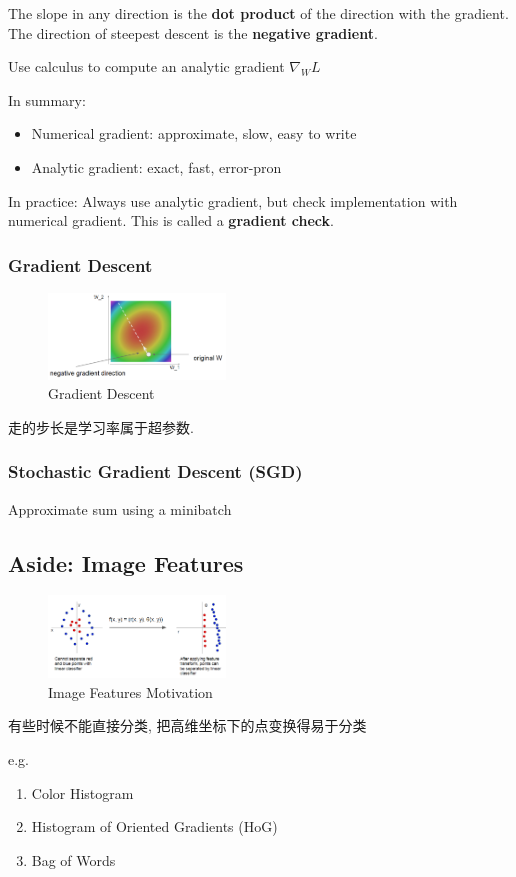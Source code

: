 The slope in any direction is the \textbf{dot product} of the direction with the gradient.  The direction of steepest descent is the \textbf{negative gradient}. 

Use calculus to compute an analytic gradient $\nabla_W L$

In summary:
\begin{itemize}\small
    \item Numerical gradient: approximate, slow, easy to write
    \item Analytic gradient: exact, fast, error-pron
\end{itemize}

In practice: Always use analytic gradient, but check implementation with numerical gradient. This is called a \textbf{gradient check}.


\subsubsection{Gradient Descent}

\begin{figure}[!htb]
    \centering
    \includegraphics[width=0.42\textwidth]{pic/Lec3/Gradient Descent.png}
    \caption{Gradient Descent}
\end{figure}

走的步长是学习率属于超参数. 

\subsubsection{Stochastic Gradient Descent (SGD)}
Approximate sum using a minibatch


\subsection{Aside: Image Features}
\begin{figure}[!htb]
    \centering
    \includegraphics[width=0.42\textwidth]{pic/Lec3/Motivation}
    \caption{Image Features Motivation}
\end{figure}
有些时候不能直接分类, 把高维坐标下的点变换得易于分类

e.g. 
\begin{enumerate}
    \item Color Histogram
    \item Histogram of Oriented Gradients (HoG)
    \item Bag of Words
\end{enumerate}



